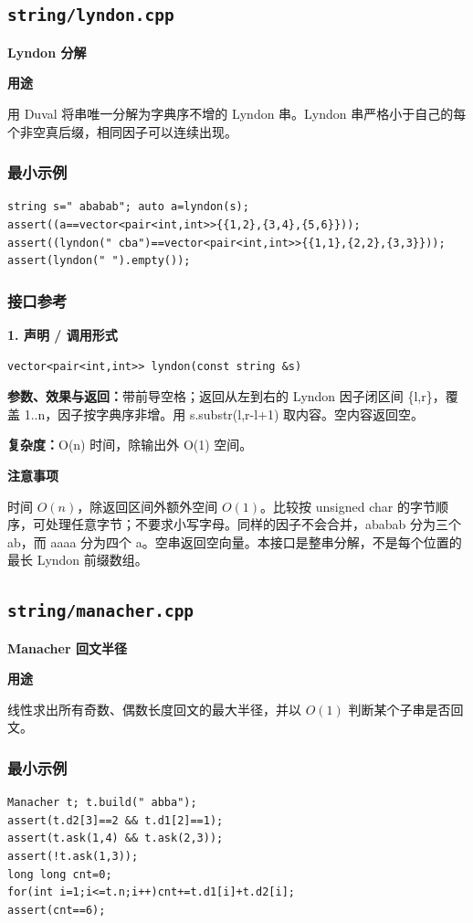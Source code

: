 \documentclass[UTF8,a4paper,10pt]{ctexart}
\newcommand{\TemplUsage}[1]{\textbf{用途}\par #1\par}
\newcommand{\TemplNote}[1]{\textbf{注意事项}\par #1\par}
\begin{document}
\subsection{\texttt{string/lyndon.cpp}}
\textbf{Lyndon 分解}\par
\TemplUsage{用 Duval 将串唯一分解为字典序不增的 Lyndon 串。Lyndon 串严格小于自己的每个非空真后缀，相同因子可以连续出现。}
\subsubsection*{最小示例}
\begin{lstlisting}
string s=" ababab"; auto a=lyndon(s);
assert((a==vector<pair<int,int>>{{1,2},{3,4},{5,6}}));
assert((lyndon(" cba")==vector<pair<int,int>>{{1,1},{2,2},{3,3}}));
assert(lyndon(" ").empty());
\end{lstlisting}
\subsubsection*{接口参考}
\noindent\begin{minipage}{\textwidth}
\textbf{1. 声明 / 调用形式}
\begin{lstlisting}
vector<pair<int,int>> lyndon(const string &s)
\end{lstlisting}
\textbf{参数、效果与返回：}带前导空格；返回从左到右的 Lyndon 因子闭区间 \{l,r\}，覆盖 1..n，因子按字典序非增。用 s.substr(l,r-l+1) 取内容。空内容返回空。

\textbf{复杂度：}O(n) 时间，除输出外 O(1) 空间。

\TemplNote{时间 $O(n)$，除返回区间外额外空间 $O(1)$。比较按 unsigned char 的字节顺序，可处理任意字节；不要求小写字母。同样的因子不会合并，ababab 分为三个 ab，而 aaaa 分为四个 a。空串返回空向量。本接口是整串分解，不是每个位置的最长 Lyndon 前缀数组。}
\end{minipage}\par\vspace{0.4em}
\clearpage
\subsection{\texttt{string/manacher.cpp}}
\textbf{Manacher 回文半径}\par
\TemplUsage{线性求出所有奇数、偶数长度回文的最大半径，并以 $O(1)$ 判断某个子串是否回文。}
\subsubsection*{最小示例}
\begin{lstlisting}
Manacher t; t.build(" abba");
assert(t.d2[3]==2 && t.d1[2]==1);
assert(t.ask(1,4) && t.ask(2,3));
assert(!t.ask(1,3));
long long cnt=0;
for(int i=1;i<=t.n;i++)cnt+=t.d1[i]+t.d2[i];
assert(cnt==6);
\end{lstlisting}
\end{document}
